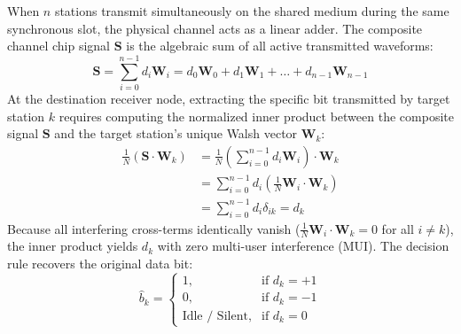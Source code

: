 \documentclass[11pt,a4paper]{article}
\begin{document}
When $n$ stations transmit simultaneously on the shared medium during the same synchronous slot, the physical channel acts as a linear adder. The composite channel chip signal $\mathbf{S}$ is the algebraic sum of all active transmitted waveforms:
\begin{equation}
    \mathbf{S} = \sum_{i=0}^{n-1} d_i \mathbf{W}_i = d_0 \mathbf{W}_0 + d_1 \mathbf{W}_1 + \dots + d_{n-1} \mathbf{W}_{n-1}
\end{equation}
At the destination receiver node, extracting the specific bit transmitted by target station $k$ requires computing the normalized inner product between the composite signal $\mathbf{S}$ and the target station's unique Walsh vector $\mathbf{W}_k$:
\begin{align}
    \frac{1}{N} (\mathbf{S} \cdot \mathbf{W}_k) &= \frac{1}{N} \left( \sum_{i=0}^{n-1} d_i \mathbf{W}_i \right) \cdot \mathbf{W}_k \nonumber \\
    &= \sum_{i=0}^{n-1} d_i \left( \frac{1}{N} \mathbf{W}_i \cdot \mathbf{W}_k \right) \nonumber \\
    &= \sum_{i=0}^{n-1} d_i \delta_{ik} = d_k
\end{align}
Because all interfering cross-terms identically vanish ($\frac{1}{N} \mathbf{W}_i \cdot \mathbf{W}_k = 0$ for all $i \ne k$), the inner product yields $d_k$ with zero multi-user interference (MUI). The decision rule recovers the original data bit:
\begin{equation}
    \hat{b}_k = \begin{cases} 1, & \text{if } d_k = +1 \\ 0, & \text{if } d_k = -1 \\ \text{Idle / Silent}, & \text{if } d_k = 0 \end{cases}
\end{equation}
\end{document}
